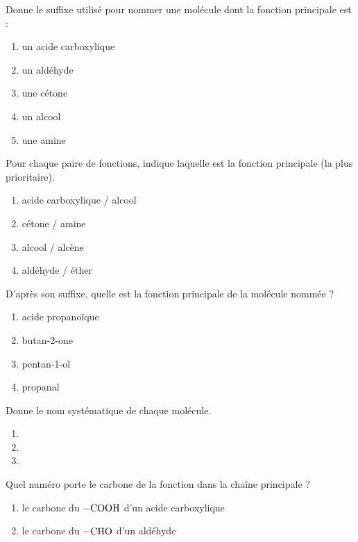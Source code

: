 \documentclass[11pt,a4paper]{article}
\begin{document}
\begin{exo}
Donne le suffixe utilisé pour nommer une molécule dont la fonction principale est :
\begin{enumerate}[label=\alph*)]
  \item un acide carboxylique
  \item un aldéhyde
  \item une cétone
  \item un alcool
  \item une amine
\end{enumerate}
\end{exo}

\begin{exo}
Pour chaque paire de fonctions, indique laquelle est la fonction principale (la plus prioritaire).
\begin{enumerate}[label=\alph*)]
  \item acide carboxylique / alcool
  \item cétone / amine
  \item alcool / alcène
  \item aldéhyde / éther
\end{enumerate}
\end{exo}

\begin{exo}
D'après son suffixe, quelle est la fonction principale de la molécule nommée ?
\begin{enumerate}[label=\alph*)]
  \item acide propanoïque
  \item butan-2-one
  \item pentan-1-ol
  \item propanal
\end{enumerate}
\end{exo}

\begin{exo}
Donne le nom systématique de chaque molécule.
\begin{enumerate}[label=\alph*)]
  \item {}
  \item {}
  \item {}
\end{enumerate}
\end{exo}

\begin{exo}
Quel numéro porte le carbone de la fonction dans la chaîne principale ?
\begin{enumerate}[label=\alph*)]
  \item le carbone du $-\ce{COOH}$ d'un acide carboxylique
  \item le carbone du $-\ce{CHO}$ d'un aldéhyde
\end{enumerate}
\end{exo}
\end{document}

